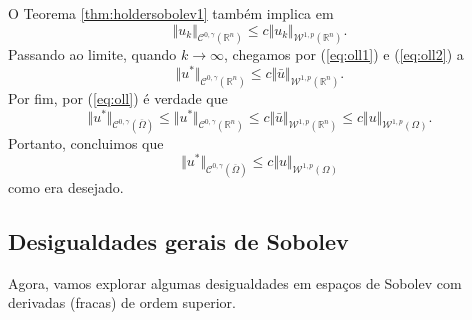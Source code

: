 \documentclass[a4paper, 11pt]{book}
\theoremstyle{definition}
\newcommand{\bR}{\mathbb{R}}
\newcommand{\cC}{\mathcal{C}}
\newcommand{\cW}{\mathcal{W}}
\begin{document}
\begin{prf}
    O Teorema \ref{thm:holdersobolev1} também implica em
    \[
        \Vert u_k \Vert_{\cC^{0,\gamma}(\bR^n)} \leqslant c \Vert u_k \Vert_{\cW^{1,p}(\bR^n)}.
    \]
    Passando ao limite, quando $k \to \infty$, chegamos por (\ref{eq:oll1}) e (\ref{eq:oll2}) a
    \[
        \Vert u^* \Vert_{\cC^{0,\gamma}(\bR^n)} \leqslant c \Vert \bar u \Vert_{\cW^{1,p}(\bR^n)}.
    \]
    Por fim, por (\ref{eq:oll}) é verdade que
    \[
        \Vert u^* \Vert_{\cC^{0,\gamma}(\overline \Omega)} \leqslant \Vert u^* \Vert_{\cC^{0,\gamma}(\bR^n)} \leqslant c \Vert \bar u \Vert_{\cW^{1,p}(\bR^n)} \leqslant c \Vert u \Vert_{\cW^{1,p}(\Omega)}.
    \]
    Portanto, concluimos que
    \[
        \Vert u^* \Vert_{\cC^{0,\gamma}(\overline\Omega)} \leqslant c \Vert u \Vert_{\cW^{1,p}(\Omega)}
    \]
    como era desejado.
\end{prf}

\subsection{Desigualdades gerais de Sobolev}

Agora, vamos explorar algumas desigualdades em espaços de Sobolev com derivadas (fracas) de ordem superior.
\end{document}
